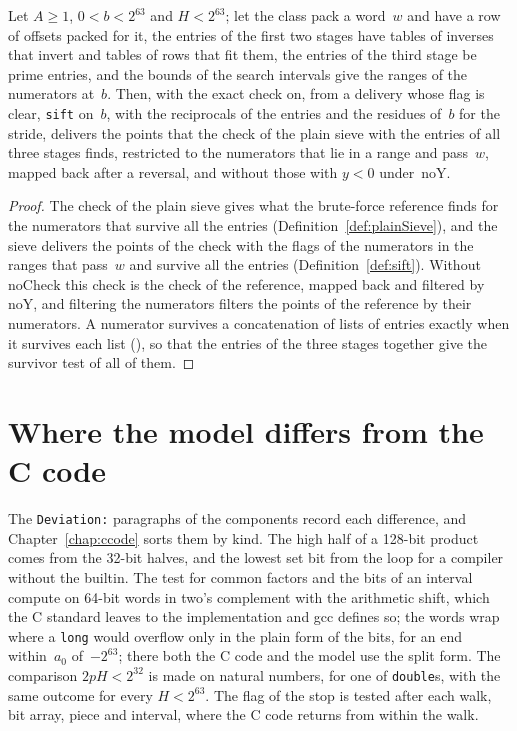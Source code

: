 \begin{theorem}\label{thm:sift_eq_checkDen}
  \leanok
  Let $A \ge 1$, $0 < b < 2^{63}$ and $H < 2^{63}$; let the class pack a word~$w$ and have a row of
  offsets packed for it, the entries of the first two stages have tables of inverses that invert and
  tables of rows that fit them, the entries of the third stage be prime entries, and the bounds of
  the search intervals give the ranges of the numerators at~$b$. Then, with the exact check on, from
  a delivery whose flag is clear, \verb|sift| on~$b$, with the reciprocals of the entries and the
  residues of~$b$ for the stride, delivers the points that the check of the plain sieve with the
  entries of all three stages finds, restricted to the numerators that lie in a range and pass~$w$,
  mapped back after a reversal, and without those with $y < 0$ under~$\mathrm{noY}$.
\end{theorem}

\begin{proof}
  \leanok
  The check of the plain sieve gives what the brute-force reference finds for the numerators that
  survive all the entries (Definition~\ref{def:plainSieve}), and the sieve delivers the points of
  the check with the flags of the numerators in the ranges that pass~$w$ and survive all the
  entries (Definition~\ref{def:sift}). Without~$\mathrm{noCheck}$ this check is the check of the
  reference, mapped back and filtered by~$\mathrm{noY}$, and filtering the numerators filters the
  points of the reference by their numerators. A numerator survives a concatenation of lists of
  entries exactly when it survives each list (), so that
  the entries of the three stages together give the survivor test of all of them.
\end{proof}

\section{Where the model differs from the C code}\label{sec:sieveDeviations}

The \verb|Deviation:| paragraphs of the components record each difference, and
Chapter~\ref{chap:ccode} sorts them by kind. The high half of a 128-bit product comes from the
32-bit halves, and the lowest set bit from the loop for a compiler without the builtin. The test
for common factors and the bits of an interval compute on 64-bit words in two's complement with the
arithmetic shift, which the C standard leaves to the implementation and gcc defines so; the words
wrap where a \verb|long| would overflow only in the plain form of the bits, for an end
within~$a_0$ of~$-2^{63}$; there both the C code and the model use the split form. The comparison
$2pH < 2^{32}$ is made on natural numbers, for one of \verb|double|s, with the same outcome for
every $H < 2^{63}$. The flag of the stop is tested after each walk, bit array, piece and interval,
where the C code returns from within the walk.
